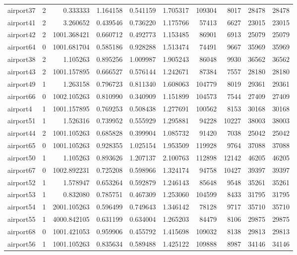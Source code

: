 \begin{longtable}{|l|r|r|r|r|r|r|r|r|r|}
airport37 & 2 & 0.333333 & 1.164158 & 0.541159 & 1.705317 & 109304 & 8017 & 28478 & 28478 \\
airport41 & 2 & 3.260652 & 0.439546 & 0.736220 & 1.175766 & 57413 & 6627 & 23015 & 23015 \\
airport42 & 2 & 1001.368421 & 0.660712 & 0.492773 & 1.153485 & 86901 & 6913 & 25079 & 25079 \\
airport64 & 0 & 1001.681704 & 0.585186 & 0.928288 & 1.513474 & 74491 & 9667 & 35969 & 35969 \\
airport38 & 2 & 1.105263 & 0.895256 & 1.009987 & 1.905243 & 86048 & 9930 & 36562 & 36562 \\
airport43 & 2 & 1001.157895 & 0.666527 & 0.576144 & 1.242671 & 87384 & 7557 & 28180 & 28180 \\
airport49 & 1 & 1.263158 & 0.796723 & 0.811340 & 1.608063 & 104779 & 8019 & 29361 & 29361 \\
airport66 & 0 & 1002.105263 & 0.810990 & 0.340909 & 1.151899 & 104573 & 7544 & 27409 & 27409 \\
airport4 & 1 & 1001.157895 & 0.769253 & 0.508438 & 1.277691 & 100562 & 8153 & 30168 & 30168 \\
airport51 & 1 & 1.526316 & 0.739952 & 0.555929 & 1.295881 & 94228 & 10227 & 38003 & 38003 \\
airport44 & 2 & 1001.105263 & 0.685828 & 0.399904 & 1.085732 & 91420 & 7038 & 25042 & 25042 \\
airport65 & 0 & 1001.105263 & 0.928355 & 1.025154 & 1.953509 & 119928 & 9764 & 37088 & 37088 \\
airport50 & 1 & 1.105263 & 0.893626 & 1.207137 & 2.100763 & 112898 & 12142 & 46205 & 46205 \\
airport67 & 0 & 1002.892231 & 0.725208 & 0.598966 & 1.324174 & 94758 & 10427 & 39397 & 39397 \\
airport52 & 1 & 1.578947 & 0.653264 & 0.592879 & 1.246143 & 85648 & 9548 & 35261 & 35261 \\
airport53 & 1 & 0.832080 & 0.785751 & 0.467309 & 1.253060 & 104599 & 8433 & 31795 & 31795 \\
airport54 & 1 & 2001.105263 & 0.596499 & 0.749643 & 1.346142 & 78128 & 9717 & 35710 & 35710 \\
airport55 & 1 & 4000.842105 & 0.631199 & 0.634004 & 1.265203 & 84479 & 8106 & 29875 & 29875 \\
airport68 & 0 & 1001.421053 & 0.959906 & 0.455792 & 1.415698 & 109032 & 8138 & 29813 & 29813 \\
airport56 & 1 & 1001.105263 & 0.835634 & 0.589488 & 1.425122 & 109888 & 8987 & 34146 & 34146 \\

\end{longtable}
